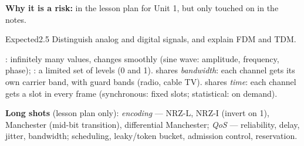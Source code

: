 \textbf{Why it is a risk:} in the lesson plan for Unit 1, but only touched on in the notes.
\begin{question}{Expected}{2.5}
Distinguish analog and digital signals, and explain FDM and TDM.
\end{question}
\begin{solution}
: infinitely many values, changes smoothly (sine wave: amplitude, frequency, phase); : a limited set of levels (0 and 1).  shares \emph{bandwidth}: each channel gets its own carrier band, with guard bands (radio, cable TV).  shares \emph{time}: each channel gets a slot in every frame (synchronous: fixed slots; statistical: on demand).
\end{solution}

\textbf{Long shots} (lesson plan only): \textit{encoding} --- NRZ-L, NRZ-I (invert on 1), Manchester (mid-bit transition), differential Manchester; \textit{QoS} --- reliability, delay, jitter, bandwidth; scheduling, leaky/token bucket, admission control, reservation.

